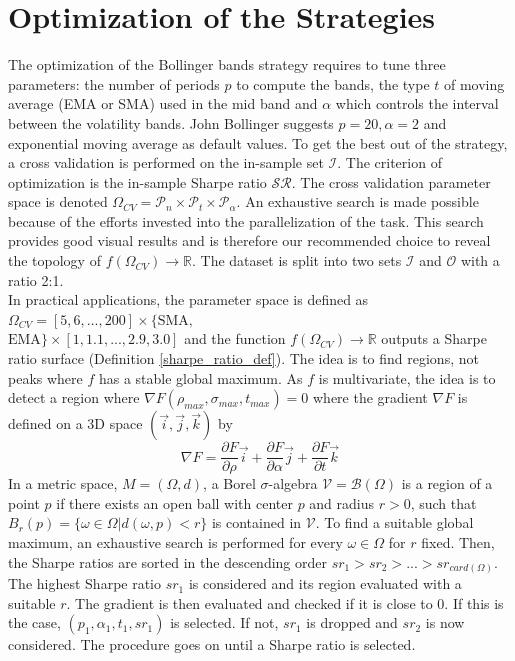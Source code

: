 \documentclass[11pt,a4,twosided,singlespacing,titlepagenumber=on]{scrreprt}
\numberwithin{equation}{chapter} %
\theoremstyle{remark}
\begin{document}
\section{Optimization of the Strategies}
\label{sec:optimization_strategy}
The optimization of the Bollinger bands strategy requires to tune three parameters: the number of periods $p$ to compute the bands, the type $t$ of moving average (EMA or SMA) used in the mid band and $\alpha$ which controls the interval between the volatility bands. John Bollinger suggests $p = 20, \alpha = 2$ and exponential moving average as default values. To get the best out of the strategy, a cross validation is performed on the in-sample set $\mathcal{I}$. The criterion of optimization is the in-sample Sharpe ratio $\mathcal{SR}$. The cross validation parameter space is denoted  $\Omega_{CV} = \mathcal{P}_n \times \mathcal{P}_t \times \mathcal{P}_\alpha$. An exhaustive search is made possible because of the efforts invested into the parallelization of the task. This search provides good visual results and is therefore our recommended choice to reveal the topology of $f(\Omega_{CV}) \rightarrow \mathbb{R}$. The dataset is split into two sets $\mathcal{I}$ and $\mathcal{O}$ with a ratio 2:1. \\

In practical applications, the parameter space is defined as $\Omega_{CV}  = [5,6,...,200] \times \{\text{SMA}, $\\$\text{EMA}\} \times [1,1.1,...,2.9,3.0]$ and the function $f(\Omega_{CV}) \rightarrow \mathbb{R}$ outputs a Sharpe ratio surface (Definition \ref{sharpe_ratio_def}). The idea is to find regions, not peaks where $f$ has a stable global maximum. As $f$ is multivariate, the idea is to detect a region where $\nabla F(\rho_{max}, \sigma_{max}, t_{max}) = 0$ where the gradient $\nabla F$ is defined on a 3D space $(\vec{i}, \vec{j}, \vec{k})$ by
\begin{equation}
\nabla F = \frac{\partial F}{\partial \rho} \vec{i} + \frac{\partial F}{\partial \alpha} \vec{j} + \frac{\partial F}{\partial t} \vec{k}
\end{equation}
In a metric space, $M = (\Omega, d)$, a Borel $\sigma$-algebra $\mathcal{V} = \mathcal{B}(\Omega)$ is a region of a point $p$ if there exists an open ball with center $p$ and radius $r > 0$, such that $B_r(p) = \{\omega \in \Omega | d(\omega, p) < r\}$ is contained in $\mathcal{V}$. To find a suitable global maximum, an exhaustive search is performed for every $\omega \in \Omega$ for $r$ fixed. Then, the Sharpe ratios are sorted in the descending order $sr_1 > sr_2 > ... > sr_{card(\Omega)}$. The highest Sharpe ratio $sr_1$ is considered and its region evaluated with a suitable $r$. The gradient is then evaluated and checked if it is close to 0. If this is the case, $(p_1, \alpha_1, t_1, sr_1)$ is selected. If not, $sr_1$ is dropped and $sr_2$ is now considered. The procedure goes on until a Sharpe ratio is selected.
 
\end{document}
